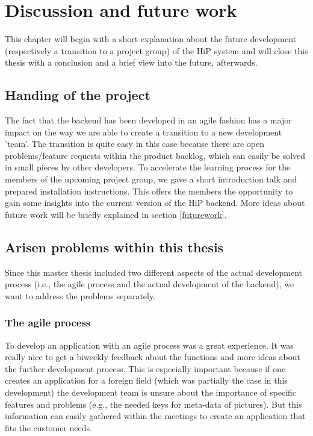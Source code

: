 \chapter[Discussion and future work]{Discussion and future work}
This chapter will begin with a short explanation about the future development (respectively a transition to a project group) of the \ac{HiP} system and will close this thesis with a conclusion and a brief view into the future, afterwards. 

\section{Handing of the project}
The fact that the backend has been developed in an agile fashion has a major impact on the way we are able to create a transition to a new development 'team'.  The transition is quite easy in this case because there are open problems/feature requests within the product backlog, which can easily be solved in small pieces by other developers. To accelerate the learning process for the members of the upcoming project group, we gave a short introduction talk and prepared installation instructions. This offers the members the opportunity to gain some insights into the current version of the \ac{HiP} backend. More ideas about future work will be briefly explained in section \ref{futurework}. 

\section{Arisen problems within this thesis}
Since this master thesis included two different aspects of the actual development process (i.e., the agile process and the actual development of the backend), we want to address the problems separately. 

\subsection{The agile process}
To develop an application with an agile process was a great experience. It was really nice to get a biweekly feedback about the functions and more ideas about the further development process. This is especially important because if one creates an application for a foreign field (which was partially the case in this development) the development team is unsure about the importance of specific features and problems (e.g., the needed keys for meta-data of pictures). But this information can easily gathered within the meetings to create an application that fits the customer needs. 


